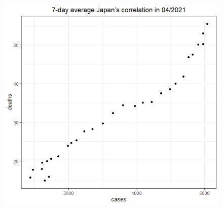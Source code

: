 \documentclass[a4paper]{article}
\theoremstyle{definition}
\begin{document}
\begin{enumerate}[1)]
\begin{figure}[H]
\begin{center}
        \includegraphics[scale = 0.3]{ix/ix.3/JPN_04_2021.png}
        

\end{center}
\end{figure}
\end{enumerate}
\end{document}
